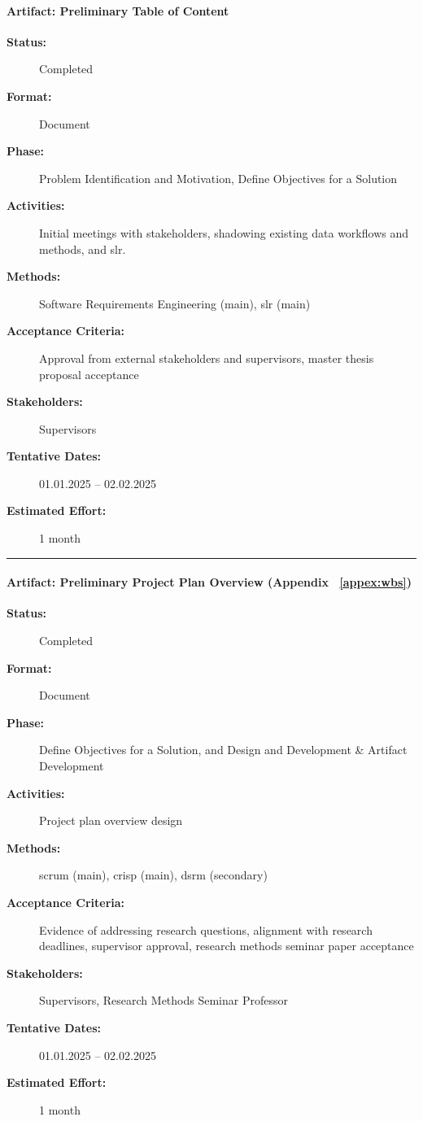 \paragraph{Artifact: Preliminary Table of Content}
\begin{description}
  \item[\textbf{Status:}] Completed
    \item[\textbf{Format:}] Document
  \item[\textbf{Phase:}] Problem Identification and Motivation, Define Objectives for a Solution
  \item[\textbf{Activities:}] Initial meetings with stakeholders, shadowing existing data workflows and methods, and \acrshort{slr}.
  \item[\textbf{Methods:}] Software Requirements Engineering (main), \acrshort{slr} (main)
  \item[\textbf{Acceptance Criteria:}] Approval from external stakeholders and supervisors, master thesis proposal acceptance
  \item[\textbf{Stakeholders:}] Supervisors
  \item[\textbf{Tentative Dates:}] 01.01.2025 – 02.02.2025
  \item[\textbf{Estimated Effort:}] 1 month
  \end{description}

\noindent\rule{13cm}{0.3pt}

\paragraph{Artifact: Preliminary Project Plan Overview (Appendix ~\ref{appex:wbs})}
\begin{description}
  \item[\textbf{Status:}] Completed
  \item[\textbf{Format:}] Document
  \item[\textbf{Phase:}] Define Objectives for a Solution, and Design and Development \& Artifact Development
  \item[\textbf{Activities:}] Project plan overview design
  \item[\textbf{Methods:}] \acrshort{scrum} (main), \acrshort{crisp} (main), \acrshort{dsrm} (secondary)
  \item[\textbf{Acceptance Criteria:}] Evidence of addressing research questions, alignment with research deadlines, supervisor approval, research methods seminar paper acceptance
  \item[\textbf{Stakeholders:}] Supervisors, Research Methods Seminar Professor
  \item[\textbf{Tentative Dates:}] 01.01.2025 – 02.02.2025
  \item[\textbf{Estimated Effort:}] 1 month
\end{description}

